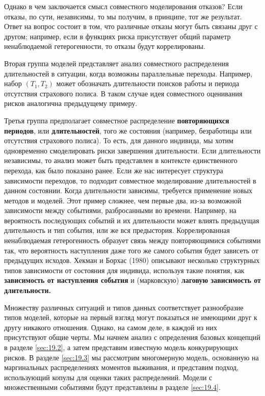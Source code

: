 Однако в чем заключается смысл совместного моделирования отказов? Если отказы, по сути, независимы, то мы получим, в принципе, тот же результат. Ответ на вопрос состоит в том, что различные отказы могут быть связаны друг с другом; например, если в функциях риска присутствует общий параметр ненаблюдаемой гетерогенности, то отказы будут коррелированы.


Вторая группа моделей представляет анализ совместного распределения длительностей в ситуации, когда возможны параллельные переходы. Например, набор $(T_1, T_2)$ может обозначать длительности поисков работы и периода отсутствия страхового полиса. В таком случае идея совместного оценивания рисков аналогична предыдущему примеру.

Третья группа предполагает совместное распределение \textbf{повторяющихся периодов}, или \textbf{длительностей},
того же состояния (например, безработицы или отсутствия страхового полиса). То есть, для данного индивида, мы хотим одновременно смоделировать риски завершения длительности. Если длительности независимы, то анализ может быть представлен в контексте единственного перехода, как было показано ранее. Если же нас интересует структура зависимости переходов, то подходит совместное моделирование длительностей в данном состоянии. Когда длительности зависимы, требуется применение новых методов и моделей. Этот пример сложнее, чем первые два, из-за возможной зависимости между событиями, разбросанными во времени. Например, на вероятность последующих событий и их длительности может влиять предыдущая длительность и тип события, или же вся предыстория. Коррелированная ненаблюдаемая гетерогенность образует связь между повторяющимися событиями так, что вероятность наступления даже того же самого события будет зависеть от предыдущих исходов. Хекман и Борхас (1980) описывают несколько структурных типов зависимости от состояния для индивида, используя такие понятия, как \textbf{зависимость от наступления события} и (марковскую) \textbf{лаговую зависимость от длительности.}

Множеству различных ситуаций и типов данных соответствует разнообразие типов моделей, которые на первый взгляд могут показаться не имеющими друг к другу никакого отношения. Однако, на самом деле, в каждой из них присутствуют общие черты. Мы начнем анализ с определения базовых концепций в разделе \ref{sec:19.2}, а затем представим известную модель конкурирующих рисков. В разделе \ref{sec:19.3} мы рассмотрим многомерную модель, основанную на маргинальных распределениях моментов выживания, и представим подход, использующий копулы для оценки таких распределений. Модели с множественными событиями будут представлены в разделе \ref{sec:19.4}.




